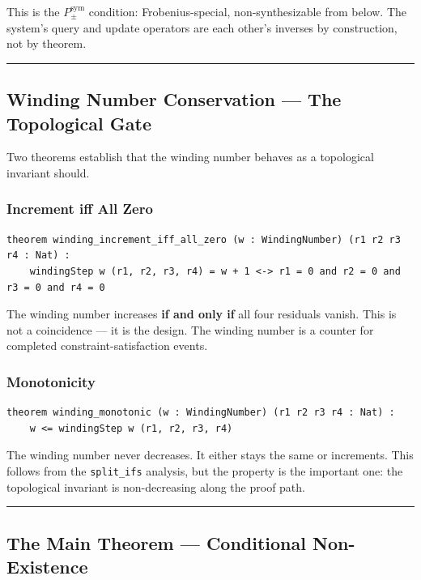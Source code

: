 \documentclass[12pt,a4paper]{article}
\begin{document}
This is the $P_{\pm}^{\text{sym}}$ condition: Frobenius-special, non-synthesizable from below. The system's query and update operators are each other's inverses by construction, not by theorem.

\begin{center}
\rule{0.5\textwidth}{0.4pt}
\end{center}

\subsection{Winding Number Conservation --- The Topological Gate}

Two theorems establish that the winding number behaves as a topological invariant should.

\subsubsection{Increment iff All Zero}

\begin{lstlisting}[language=lean]
theorem winding_increment_iff_all_zero (w : WindingNumber) (r1 r2 r3 r4 : Nat) :
    windingStep w (r1, r2, r3, r4) = w + 1 <-> r1 = 0 and r2 = 0 and r3 = 0 and r4 = 0
\end{lstlisting}

The winding number increases \textbf{if and only if} all four residuals vanish. This is not a coincidence --- it is the design. The winding number is a counter for completed constraint-satisfaction events.

\subsubsection{Monotonicity}

\begin{lstlisting}[language=lean]
theorem winding_monotonic (w : WindingNumber) (r1 r2 r3 r4 : Nat) :
    w <= windingStep w (r1, r2, r3, r4)
\end{lstlisting}

The winding number never decreases. It either stays the same or increments. This follows from the \texttt{split\_ifs} analysis, but the property is the important one: the topological invariant is non-decreasing along the proof path.

\begin{center}
\rule{0.5\textwidth}{0.4pt}
\end{center}

\subsection{The Main Theorem --- Conditional Non-Existence}
\end{document}
